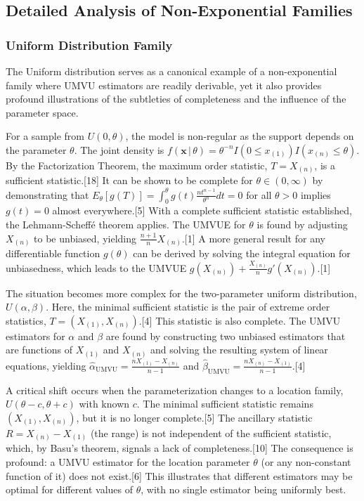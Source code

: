 \documentclass[11pt, letterpaper]{article}
\newcommand{\given}{\,|\,}
\begin{document}
\subsection*{Detailed Analysis of Non-Exponential Families}

\subsubsection*{Uniform Distribution Family}
The Uniform distribution serves as a canonical example of a non-exponential family where UMVU estimators are readily derivable, yet it also provides profound illustrations of the subtleties of completeness and the influence of the parameter space.

For a sample from $U(0,\theta)$, the model is non-regular as the support depends on the parameter $\theta$. The joint density is $f(\mathbf{x} \given \theta) = \theta^{-n} I(0 \le x_{(1)}) I(x_{(n)} \le \theta)$. By the Factorization Theorem, the maximum order statistic, $T=X_{(n)}$, is a sufficient statistic.[18] It can be shown to be complete for $\theta \in (0, \infty)$ by demonstrating that $E_\theta[g(T)] = \int_0^\theta g(t) \frac{nt^{n-1}}{\theta^n} dt = 0$ for all $\theta>0$ implies $g(t)=0$ almost everywhere.[5] With a complete sufficient statistic established, the Lehmann-Scheffé theorem applies. The UMVUE for $\theta$ is found by adjusting $X_{(n)}$ to be unbiased, yielding $\frac{n+1}{n} X_{(n)}$.[1] A more general result for any differentiable function $g(\theta)$ can be derived by solving the integral equation for unbiasedness, which leads to the UMVUE $g(X_{(n)}) + \frac{X_{(n)}}{n} g'(X_{(n)})$.[1]

The situation becomes more complex for the two-parameter uniform distribution, $U(\alpha,\beta)$. Here, the minimal sufficient statistic is the pair of extreme order statistics, $T=(X_{(1)}, X_{(n)})$.[4] This statistic is also complete. The UMVU estimators for $\alpha$ and $\beta$ are found by constructing two unbiased estimators that are functions of $X_{(1)}$ and $X_{(n)}$ and solving the resulting system of linear equations, yielding $\hat{\alpha}_{\text{UMVU}} = \frac{n X_{(1)} - X_{(n)}}{n-1}$ and $\hat{\beta}_{\text{UMVU}} = \frac{n X_{(n)} - X_{(1)}}{n-1}$.[4]

A critical shift occurs when the parameterization changes to a location family, $U(\theta-c, \theta+c)$ with known $c$. The minimal sufficient statistic remains $(X_{(1)}, X_{(n)})$, but it is no longer complete.[5] The ancillary statistic $R=X_{(n)} - X_{(1)}$ (the range) is not independent of the sufficient statistic, which, by Basu's theorem, signals a lack of completeness.[10] The consequence is profound: a UMVU estimator for the location parameter $\theta$ (or any non-constant function of it) does not exist.[6] This illustrates that different estimators may be optimal for different values of $\theta$, with no single estimator being uniformly best.
\end{document}
